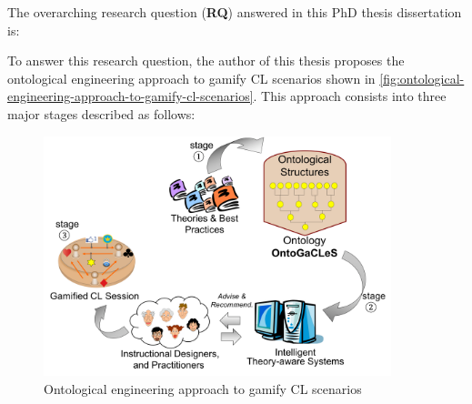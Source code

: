 The overarching research question (\textbf{RQ}) answered in this PhD thesis dissertation is: 

To answer this research question, the author of this thesis proposes the ontological engineering approach to gamify CL scenarios shown in \autoref{fig:ontological-engineering-approach-to-gamify-cl-scenarios}. This approach consists into three major stages described as follows:

\begin{figure}[htb]
 \caption{Ontological engineering approach to gamify CL scenarios}
 \label{fig:ontological-engineering-approach-to-gamify-cl-scenarios}
 \centering
 \includegraphics[width=0.9\textwidth]{images/chap-introduction/ontological-engineering-approach-to-gamify-cl-scenarios.png}
 \fautor
\end{figure}

